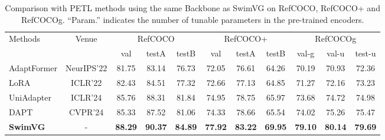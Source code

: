 \begin{table*}[!t]
\centering
\caption{Comparison with PETL methods using the same Backbone as SwimVG on RefCOCO, RefCOCO+ and RefCOCOg. ``Param.'' indicates the number of tunable parameters in the pre-trained encoders.}
\vspace{-3mm}
\label{Table:comparisons with PETL}
\small
\setlength{\tabcolsep}{4.5pt}


\begin{tabular}{l|c|ccc|ccc|ccc}
\toprule
    
\multirow{2}{*}{Methods} &\multicolumn{1}{c|}{\multirow{2}{*}{Venue}}  & \multicolumn{3}{c|}{RefCOCO} & \multicolumn{3}{c|}{RefCOCO+} & \multicolumn{3}{c}{RefCOCOg} \\

 && val & testA & testB & val & testA & testB & val-g & val-u & test-u \\ \midrule



AdaptFormer \cite{chen2022adaptformer} &NeurIPS'22 & 81.75 & 83.14 & 76.73 & 72.05 & 76.61 & 64.26 & 70.19 & 70.93 & 72.36 \\


LoRA \cite{hu2021lora}  & ICLR'22  & 82.43 & 84.51 & 77.32 & 72.66 & 77.13 & 64.85 & 71.27 & 72.16 & 73.23 \\



UniAdapter \cite{lu2024uniadapter}& ICLR'24 & 85.76 & 88.31 & 81.84 & 74.95 & 78.75 & 65.97 & 73.68 & 74.72 & 74.98 \\

DAPT \cite{zhou2024dynamic} &CVPR'24 & 85.33  & 87.52 & 81.06 & 74.33 & 78.66& 65.54 & 74.02 & 75.26 & 75.47   \\ 



\midrule
\textbf{SwimVG}  &-& \textbf{88.29} & \textbf{90.37} & \multicolumn{1}{c|}{\textbf{84.89}} &  \textbf{77.92}& \textbf{83.22} & \multicolumn{1}{c|}{\textbf{69.95}}& \textbf{79.10} & \textbf{80.14} & \textbf{79.69}  \\
\bottomrule

\end{tabular}

\end{table*}
